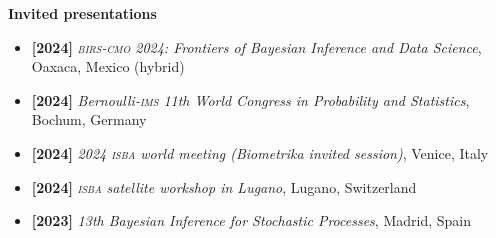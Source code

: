\documentclass[10pt]{article}
\newenvironment{outerlist}[1][\enskip\tiny\textbullet]%
        {\begin{itemize}[#1]}{\end{itemize}%
         \vspace{-.6\baselineskip}}
\begin{document}
\textbf{Invited presentations}
\begin{outerlist}

\item[\textbf{[2024]}] \textsl{\textsc{birs-cmo} 2024: Frontiers of Bayesian Inference and Data Science}, Oaxaca, Mexico (hybrid)

\item[\textbf{[2024]}] \textsl{Bernoulli-\textsc{ims} 11th World Congress in Probability and Statistics}, Bochum, Germany

\item[\textbf{[2024]}] \textsl{2024 \textsc{isba} world meeting (Biometrika invited session)}, Venice, Italy

\item[\textbf{[2024]}] \textsl{\textsc{isba} satellite workshop in Lugano}, Lugano, Switzerland

\item[\textbf{[2023]}] \textsl{13th Bayesian Inference for Stochastic Processes}, Madrid, Spain


\end{outerlist}
\end{document}
